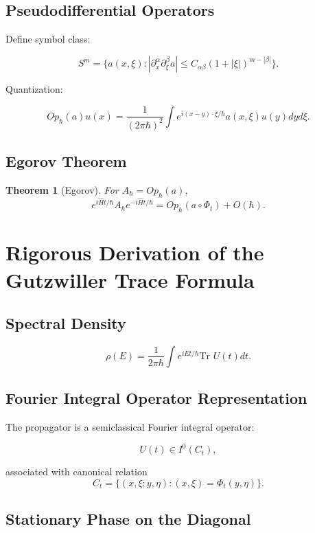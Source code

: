 \documentclass{book}
\newtheorem{theorem}{Theorem}[chapter]
\begin{document}
\section{Pseudodifferential Operators}

Define symbol class:

\[
S^m = \{ a(x,\xi) :
|\partial_x^\alpha \partial_\xi^\beta a|
\le C_{\alpha\beta}(1+|\xi|)^{m-|\beta|} \}.
\]

Quantization:

\[
Op_\hbar(a)u(x)
=
\frac{1}{(2\pi\hbar)^2}
\int e^{i(x-y)\cdot\xi/\hbar}
a(x,\xi)u(y)dyd\xi.
\]


\section{Egorov Theorem}

\begin{theorem}[Egorov]
For $A_\hbar=Op_\hbar(a)$,
\[
e^{i\hat H t/\hbar}
A_\hbar
e^{-i\hat H t/\hbar}
=
Op_\hbar(a\circ \Phi_t)
+ O(\hbar).
\]
\end{theorem}


\chapter{Rigorous Derivation of the Gutzwiller Trace Formula}

\section{Spectral Density}

\[
\rho(E)=\frac1{2\pi\hbar}
\int e^{iEt/\hbar}\text{Tr }U(t)dt.
\]

\section{Fourier Integral Operator Representation}

The propagator is a semiclassical Fourier integral operator:

\[
U(t) \in I^{0}(C_t),
\]

associated with canonical relation
\[
C_t = \{(x,\xi; y,\eta):
(x,\xi)=\Phi_t(y,\eta)\}.
\]


\section{Stationary Phase on the Diagonal}
\end{document}
